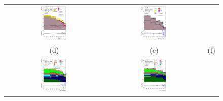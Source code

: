 \begin{figure}[H]
\begin{tabular}{@{}ccc@{}}
\includegraphics[width=0.29\textwidth]{figures/BDT/tuH_reg1l1tau1b3j_os.pdf}&
\includegraphics[width=0.29\textwidth]{figures/BDT/tuH_reg1l2tau1bnj_ss.pdf}\\
(d) & (e)  & (f) \\
\includegraphics[width=0.29\textwidth]{figures/BDT/tuH_reg2mtau1b2jos.pdf}&
\includegraphics[width=0.29\textwidth]{figures/BDT/tuH_reg2mtau1b3jos.pdf}&

\end{tabular}
\end{figure}
